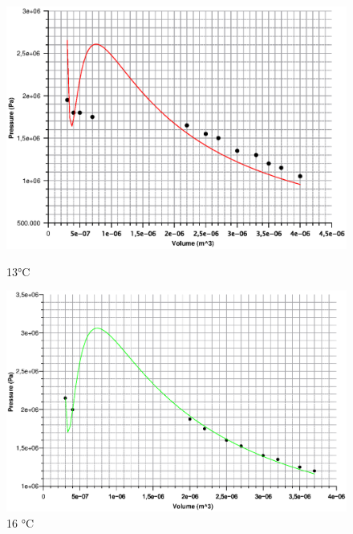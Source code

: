 \documentclass{scrartcl}
\begin{document}
\begin{figure}[htbp]
  \centering
  \begin{minipage}[b]{0.4\textwidth}
    \includegraphics[width=\textwidth]{VdW13C.eps}
    \caption{13°C}
  \end{minipage}
  \hfill
  \begin{minipage}[b]{0.4\textwidth}
    \includegraphics[width=\textwidth]{vdw16.eps}
    \caption{16 °C}
  \end{minipage}
\end{figure}
\end{document}
